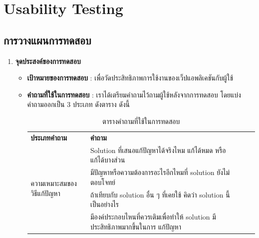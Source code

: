 \section{Usability Testing}
\subsection{การวางแผนการทดสอบ}
\begin{enumerate}
    \item \textbf{จุดประสงค์ของการทดสอบ}
          \begin{itemize}
              \item \textbf{เป้าหมายของการทดสอบ} : เพื่อวัดประสิทธิภาพการใช้งานของเว็ปแอพลิเคชันกับผู้ใช้
              \item \textbf{คำถามที่ใช้ในการทดสอบ} : เราได้เตรียมคำถามไว้ถามผู้ใช้หลังจากการทดสอบ โดยแบ่งคำถามออกเป็น 3 ประเภท ดังตาราง ดังนี้
                \begin{table}[H]
                    \caption{ตารางคำถามที่ใช้ในการทดสอบ}
                    \label{tab:question-table}
                    \begin{tabularx}{\textwidth}{|l|X|lll}
                    \cline{1-2}
                    \textbf{ประเภทคำถาม}                        & \textbf{คำถาม}                                                                                    &  &  &  \\ \cline{1-2}
                    \multirow[t]{5}{*}{ความเหมาะสมของวิธีแก้ปัญหา}       & Solution ที่เสนอแก้ปัญหาได้จริงไหม แก้ได้หมด หรือแก้ได้บางส่วน                                    &  &  &  \\ \cline{2-2}
                                                                & มีปัญหาหรือความต้องการอะไรอีกไหมที่ solution ยังไม่ตอบโจทย์                                       &  &  &  \\ \cline{2-2}
                                                                & ถ้าเทียบกับ solution อื่น ๆ ที่เคยใช้ คิดว่า solution นี้เป็นอย่างไร                              &  &  &  \\ \cline{2-2}
                                                                & มีองค์ประกอบไหนที่ควรเติมเพื่อทำให้ solution มีประสิทธิภาพมากขึ้นในการ แก้ปัญหา                   &  &  &  \\ \cline{2-2}

\end{tabularx}
\end{table}
\end{itemize}
\end{enumerate}
